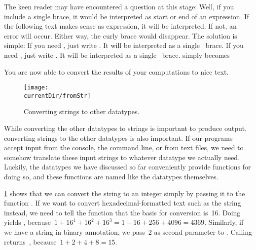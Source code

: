 %
The keen reader may have encountered a question at this stage:
\emph{}
Well, if you include a single brace, it would be interpreted as start or end of an expression.
If the following text makes sense as expression, it will be interpreted.
If not, an error will occur.
Either way, the curly brace would disappear.
The solution is simple:
If you need \inQuotes{\textbraceleft}, just write \inQuotes{\textbraceleft\textbraceleft}.\pythonIdx{\textbraceleft}\pythonIdx{\textbraceleft\textbraceleft}
It will be interpreted as a single \inQuotes{\textbraceleft}~brace.
If you need \inQuotes{\textbraceright}, just write \inQuotes{\textbraceright\textbraceright}.\pythonIdx{\textbraceright}\pythonIdx{\textbraceright\textbraceright}
It will be interpreted as a single \inQuotes{\textbraceright}~brace.
 simply becomes 

You are now able to convert the results of your computations to nice text.%
\endhsection%
%
%
\begin{figure}%
\centering%
\texttt{[image: \\currentDir/fromStr]}%
\caption{Converting strings to other datatypes.}%
\label{fig:fromStr}%
\end{figure}%
%
While converting the other datatypes to strings is important to produce output, converting strings to the other datatypes is also important.
If our programs accept input from the console, the command line, or from text files, we need to somehow translate these input strings to whatever datatype we actually need.
Luckily, the datatypes we have discussed so far conveniently provide functions for doing so, and these functions are named like the datatypes themselves.

\cref{fig:fromStr} shows that we can convert the string  to an integer  simply by passing it to the function .
If we want to convert hexadecimal-formatted text such as the string  instead, we need to tell the  function that the basis for conversion is~16.
Doing  yields , because~$1+16^1+16^2+16^3=1+16+256+4096=4369$.
Similarly, if we have a string in binary annotation, we pass~2 as second parameter to .
Calling  returns~, because~$1+2+4+8=15$.

